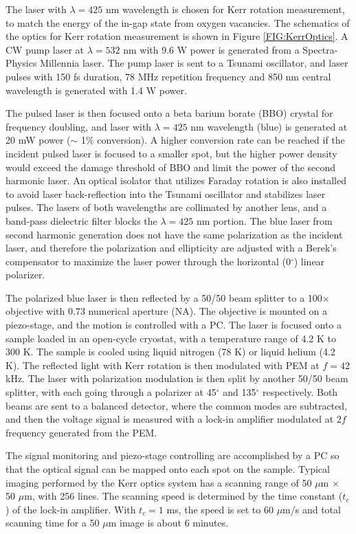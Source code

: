 \documentclass[pdflatex, sectionletters, 12pt, final, phd]{pittetd}    %
\begin{document}
The laser with $\lambda = 425$ nm wavelength is chosen for Kerr rotation measurement, to match the energy of the in-gap state from oxygen vacancies\cite{rice2014persistent}. The schematics of the optics for Kerr rotation measurement is shown in Figure \ref{FIG:KerrOptics}. A CW pump laser at $\lambda=532$ nm with 9.6 W power is generated from a Spectra-Physics Millennia laser. The pump laser is sent to a Tsunami oscillator, and laser pulses with 150 fs duration, 78 MHz repetition frequency and 850 nm central wavelength is generated with 1.4 W power. 

The pulsed laser is then focused onto a beta barium borate (BBO) crystal for frequency doubling, and laser with $\lambda=425$ nm wavelength (blue) is generated at 20 mW power ($\sim$ 1\% conversion). A higher conversion rate can be reached if the incident pulsed laser is focused to a smaller spot, but the higher power density would exceed the damage threshold of BBO and limit the power of the second harmonic laser. An optical isolator that utilizes Faraday rotation is also installed to avoid laser back-reflection into the Tsunami oscillator and stabilizes laser pulses. The lasers of both wavelengths are collimated by another lens, and a band-pass dielectric filter blocks the $\lambda=425$ nm portion. The blue laser from second harmonic generation does not have the same polarization as the incident laser, and therefore the polarization and ellipticity are adjusted with a Berek's compensator to maximize the laser power through the horizontal (0$^{\circ}$) linear polarizer. 

The polarized blue laser is then reflected by a 50/50 beam splitter to a 100$\times$ objective with 0.73 numerical aperture (NA). The objective is mounted on a piezo-stage, and the motion is controlled with a PC. The laser is focused onto a sample loaded in an open-cycle cryostat, with a temperature range of 4.2 K to 300 K. The sample is cooled using liquid nitrogen (78 K) or liquid helium (4.2 K). The reflected light with Kerr rotation is then modulated with PEM at $f = 42$ kHz. The laser with polarization modulation is then split by another 50/50 beam splitter, with each going through a polarizer at 45$^{\circ}$ and 135$^{\circ}$ respectively. Both beams are sent to a balanced detector, where the common modes are subtracted, and then the voltage signal is measured with a lock-in amplifier modulated at $2f$ frequency generated from the PEM\cite{li2016magneto}. 

The signal monitoring and piezo-stage controlling are accomplished by a PC so that the optical signal can be mapped onto each spot on the sample. Typical imaging performed by the Kerr optics system has a scanning range of 50 $\mu$m $\times$ 50 $\mu$m, with 256 lines. The scanning speed is determined by the time constant ($t_c$) of the lock-in amplifier. With $t_c = 1$ ms, the speed is set to 60 $\mu$m/s and total scanning time for a 50 $\mu$m image is about 6 minutes.
\end{document}

